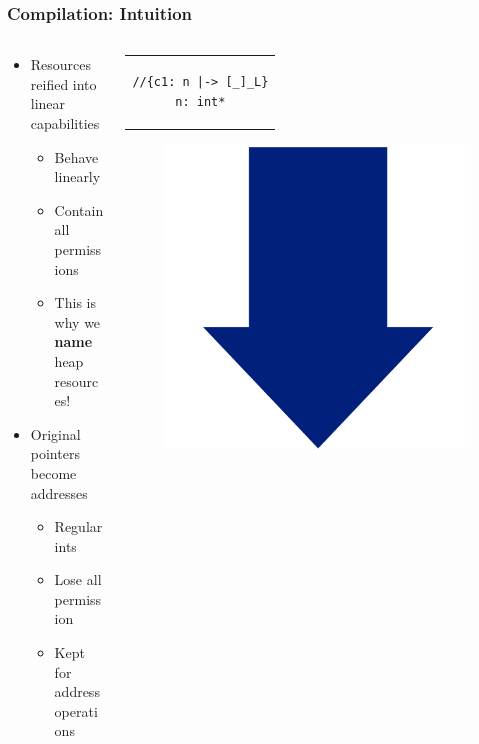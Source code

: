 \documentclass{beamer}
\begin{document}
\begin{frame}[fragile]
\frametitle{Compilation: Intuition}
\begin{columns}
\begin{column}{0.6\textwidth}
\begin{itemize}
\item Resources reified into linear capabilities
	\begin{itemize}
	\item Behave linearly
	\item Contain all permissions
	\item This is why we \textbf{name} heap resources!
	\end{itemize}
\item Original pointers become addresses
	\begin{itemize}
	\item Regular ints\footnotemark
	\item Lose all permission
	\item Kept for address operations
	\end{itemize} 
\end{itemize}

\end{column}

\begin{column}{0.4\textwidth}

\begin{center}
\begin{tabular}{c}
\begin{lstlisting}[style=CStyleNoNum, captionpos = t]
//{c1: n |-> [_]_L}
n: int*
\end{lstlisting}
\end{tabular}
\end{center}

\vspace{-.5em}
\begin{figure}[h]
\centering
\includegraphics[width=0.20\linewidth]{BlueArrowVertical}
\end{figure}
\vspace{-1em}


\end{column}
\end{columns}
\end{frame}
\end{document}
